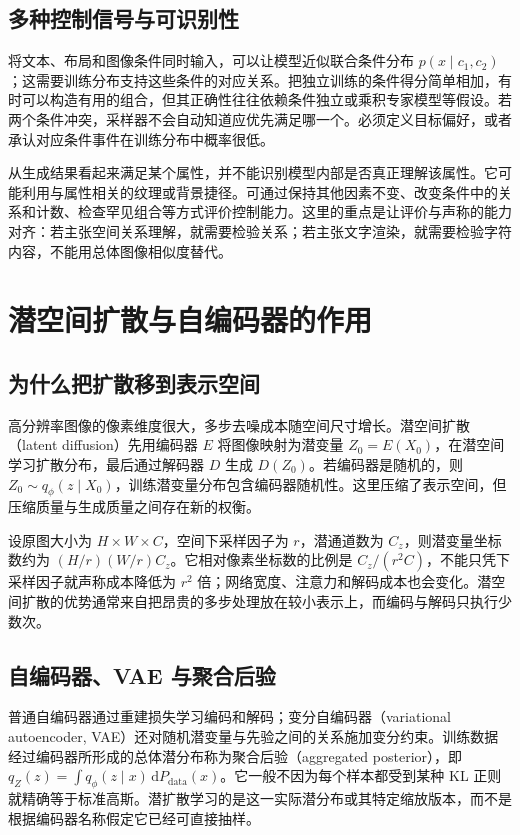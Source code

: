 \documentclass[UTF8,12pt,a4paper,fontset=fandol]{ctexart}
\begin{document}
\subsection{多种控制信号与可识别性}
将文本、布局和图像条件同时输入，可以让模型近似联合条件分布 $p(x\mid c_1,c_2)$；这需要训练分布支持这些条件的对应关系。把独立训练的条件得分简单相加，有时可以构造有用的组合，但其正确性往往依赖条件独立或乘积专家模型等假设。若两个条件冲突，采样器不会自动知道应优先满足哪一个。必须定义目标偏好，或者承认对应条件事件在训练分布中概率很低。

从生成结果看起来满足某个属性，并不能识别模型内部是否真正理解该属性。它可能利用与属性相关的纹理或背景捷径。可通过保持其他因素不变、改变条件中的关系和计数、检查罕见组合等方式评价控制能力。这里的重点是让评价与声称的能力对齐：若主张空间关系理解，就需要检验关系；若主张文字渲染，就需要检验字符内容，不能用总体图像相似度替代。

\section{潜空间扩散与自编码器的作用}
\label{sec:diff-latent}
\subsection{为什么把扩散移到表示空间}
高分辨率图像的像素维度很大，多步去噪成本随空间尺寸增长。潜空间扩散（latent diffusion）先用编码器 $E$ 将图像映射为潜变量 $Z_0=E(X_0)$，在潜空间学习扩散分布，最后通过解码器 $D$ 生成 $D(Z_0)$\cite{rombach2022}。若编码器是随机的，则 $Z_0\sim q_\phi(z\mid X_0)$，训练潜变量分布包含编码器随机性。这里压缩了表示空间，但压缩质量与生成质量之间存在新的权衡。

设原图大小为 $H\times W\times C$，空间下采样因子为 $r$，潜通道数为 $C_z$，则潜变量坐标数约为 $(H/r)(W/r)C_z$。它相对像素坐标数的比例是 $C_z/(r^2C)$，不能只凭下采样因子就声称成本降低为 $r^2$ 倍；网络宽度、注意力和解码成本也会变化。潜空间扩散的优势通常来自把昂贵的多步处理放在较小表示上，而编码与解码只执行少数次。

\subsection{自编码器、VAE 与聚合后验}
普通自编码器通过重建损失学习编码和解码；变分自编码器（variational autoencoder, VAE）还对随机潜变量与先验之间的关系施加变分约束。训练数据经过编码器所形成的总体潜分布称为聚合后验（aggregated posterior），即 $q_Z(z)=\int q_\phi(z\mid x)\,\mathrm dP_{\mathrm{data}}(x)$。它一般不因为每个样本都受到某种 KL 正则就精确等于标准高斯。潜扩散学习的是这一实际潜分布或其特定缩放版本，而不是根据编码器名称假定它已经可直接抽样。
\end{document}
